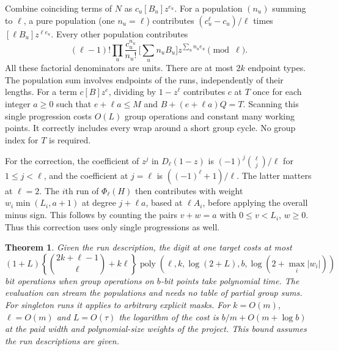 \documentclass[11pt]{article}
\newtheorem{theorem}{Theorem}
\newcommand{\Ph}{\Phi_\ell}
\begin{document}
Combine coinciding terms of $N$ as $c_u[B_u]z^{e_u}$.
For a population $(n_u)$ summing to $\ell$, a pure population (one
$n_u=\ell$) contributes $(c_u^\ell-c_u)/\ell$ times
$[\ell B_u]z^{\ell e_u}$. Every other population contributes
\[
    (\ell-1)!\prod_u\frac{c_u^{n_u}}{n_u!}\,
    \Big[\sum_u n_uB_u\Big]z^{\sum_u n_u e_u} \pmod\ell .
\]
All these factorial denominators are units. There are at most $2k$
endpoint types. The population sum involves endpoints of the runs,
independently of their lengths. For a term $c[B]z^e$, dividing by
$1-z^\ell$ contributes $c$ at $T$ once for each integer $a\ge0$
such that $e+\ell a\le M$ and $B+(e+\ell a)Q=T$. Scanning this
single progression costs $O(L)$ group operations and constant many
working points. It correctly includes every wrap around a short group
cycle. No group index for $T$ is required.

For the correction, the coefficient of $z^j$ in $D_\ell(1-z)$ is
$(-1)^j\binom{\ell}{j}/\ell$ for $1\le j<\ell$, and the coefficient
at $j=\ell$ is $(({-1})^\ell+1)/\ell$. The latter matters at $\ell=2$.
The $i$th run of $\Ph(H)$ then contributes with weight
$w_i\min(L_i,a+1)$ at degree $j+\ell a$, based at $\ell A_i$,
before applying the overall minus sign. This follows by counting the
pairs $v+w=a$ with $0\le v<L_i$, $w\ge0$. Thus this correction uses
only single progressions as well.

\begin{theorem}
Given the run description, the digit at one target costs at most
\[
    (1+L)\left\{\binom{2k+\ell-1}{\ell}+k\ell\right\}
             \operatorname{poly}(\ell,k,\log(2+L),b,\log(2+\max_i|w_i|))
\]
bit operations when group operations on $b$-bit points take polynomial
time. The evaluation can stream the populations and needs no table of
partial group sums. For singleton runs it applies to arbitrary explicit
masks. For $k=O(m)$, $\ell=O(m)$ and $L=O(\tau)$ the logarithm of
the cost is $b/m+O(m+\log b)$ at the paid width and polynomial-size
weights of the project. This bound assumes the run descriptions are given.
\end{theorem}
\end{document}
